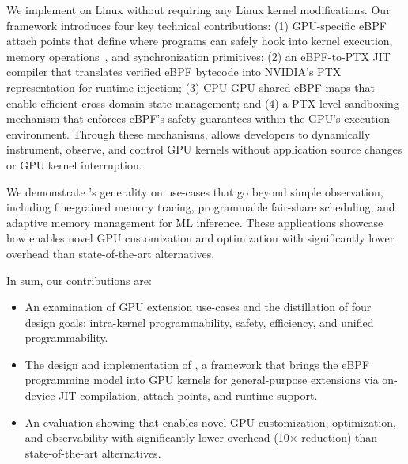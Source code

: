 We implement \sys on Linux without requiring any Linux kernel modifications. Our framework introduces four key technical contributions: (1) GPU-specific eBPF attach points that define where programs can safely hook into kernel execution, memory operations~\cite{pankratz2021vulkan,sellers2016vulkan}, and synchronization primitives; (2) an eBPF-to-PTX JIT compiler that translates verified eBPF bytecode into NVIDIA's PTX representation for runtime injection; (3) CPU-GPU shared eBPF maps that enable efficient cross-domain state management; and (4) a PTX-level sandboxing mechanism that enforces eBPF's safety guarantees within the GPU's execution environment. Through these mechanisms, \sys{} allows developers to dynamically instrument, observe, and control GPU kernels without application source changes or GPU kernel interruption.

We demonstrate \sys's generality on use-cases that go beyond simple observation, including fine-grained memory tracing, programmable fair-share scheduling, and adaptive memory management for ML inference. These applications showcase how \sys enables novel GPU customization and optimization with significantly lower overhead than state-of-the-art alternatives.%

In sum, our contributions are:
\begin{itemize}[leftmargin=*,itemsep=0pt]
    \item An examination of GPU extension use-cases and the distillation of four design goals: intra-kernel programmability, safety, efficiency, and unified programmability.

    \item The design and implementation of \sys, a framework that brings the eBPF programming model into GPU kernels for general-purpose extensions via on-device JIT compilation, attach points, and runtime support.

    \item An evaluation showing that \sys enables novel GPU customization, optimization, and observability with significantly lower overhead (10× reduction) than state-of-the-art alternatives.

\end{itemize}


